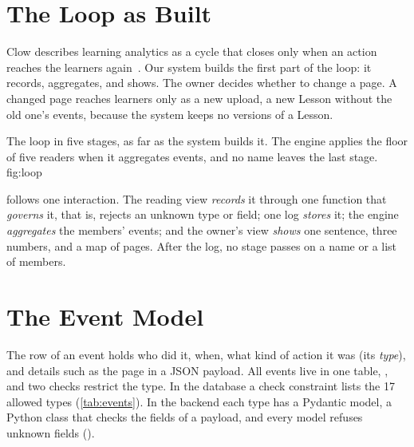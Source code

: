 \section{The Loop as Built}
\label{sec:c5-loop}

Clow describes learning analytics as a cycle that closes only when an action
reaches the learners again~\cite{clow2012cycle}. Our system builds the first
part of the loop: it records, aggregates, and shows. The owner decides whether
to change a page. A changed page reaches learners only as a new upload, a new
Lesson without the old one's events, because the system keeps no versions of
a Lesson.

  {The loop in five stages, as far as the system builds it. The engine applies
   the floor of five readers when it aggregates events, and no name leaves the
   last stage.}
  {fig:loop}

 follows one interaction. The reading view \emph{records} it
through one function that \emph{governs} it, that is, rejects an unknown type
or field; one log \emph{stores} it; the engine \emph{aggregates} the members'
events; and the owner's view \emph{shows} one sentence, three numbers, and a
map of pages. After the log, no stage passes on a name or a list of members.

\section{The Event Model}
\label{sec:c5-events}

The row of an event holds who did it, when, what kind of action it was (its
\emph{type}), and details such as the page in a JSON payload. All events live
in one table, , and two checks restrict the type. In
the database a check constraint lists the 17 allowed types
(\cref{tab:events}). In the backend each type has a Pydantic model, a Python
class that checks the fields of a payload, and every model refuses unknown
fields ().

